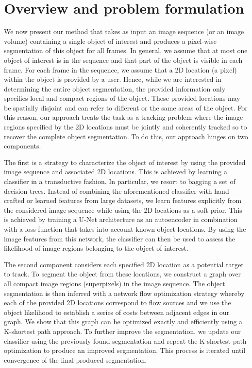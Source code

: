 \section{Overview and problem formulation}
\label{sec:overview}

We now present our method that takes as input an image sequence (or an image volume) containing a single object of interest and produces a pixel-wise segmentation of this object for all frames. In general, we assume that at most one object of interest is in the sequence and that part of the object is visible in each frame. For each frame in the sequence, we assume that a 2D location (\ie a pixel) within the object is provided by a user.
Hence, while we are interested in determining the entire object segmentation, the provided information only specifies local and compact regions of the object. These provided locations may be spatially disjoint and can refer to different or the same areas of the object. For this reason, our approach treats the task as a tracking problem where the image regions specified by the 2D locations must be jointly and coherently tracked so to recover the complete object segmentation. To do this, our approach hinges on two components. 

The first is a strategy to characterize the object of interest by using the provided image sequence and associated 2D locations. This is achieved by learning a classifier in a transductive fashion. In particular, we resort to bagging a set of decision trees. Instead of combining the aforementioned classifier with hand-crafted or learned features from large datasets, we learn features explicitly from the considered image sequence while using the 2D locations as a soft prior. This is achieved by training a U-Net architecture \cite{ronneberger2015} as an autoencoder in combination with a loss function that takes into account known object locations. By using the image features from this network, the classifier can then be used to assess the likelihood of image regions belonging to the object of interest.

The second component considers each specified 2D location as a potential target to track. To segment the object from these locations, we construct a graph over all compact image regions (\ie superpixels) in the image sequence.
The object segmentation is then inferred with a network flow optimization strategy whereby each of the provided 2D locations correspond to flow sources and we use the object likelihood to establish a series of costs between adjacent edges in our graph. We show that this graph can be optimized exactly and efficiently using a K-shortest path approach. To further improve the segmentation, we update our classifier using the previously found segmentation and repeat the K-shortest path optimization to produce an improved segmentation. This process is iterated until convergence of the final produced segmentation.

